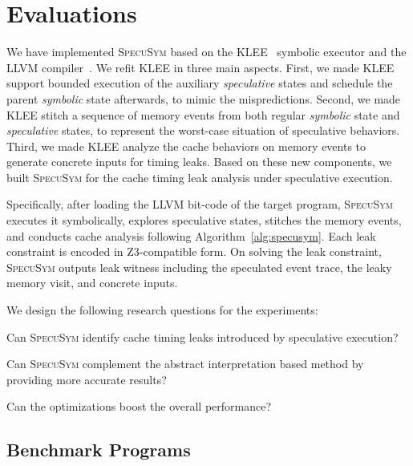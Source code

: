 \documentclass[sigconf]{acmart}
\newcommand{\SpecuSym}{\textsc{SpecuSym} }
\begin{document}
\section{Evaluations}
\label{sec:evaluation}


We have implemented \SpecuSym based on the KLEE~\cite{CadarDE08} symbolic 
executor and the LLVM compiler~\cite{LattnerA04}. We refit KLEE in three
main aspects. First, we made KLEE support bounded execution of the  
auxiliary \textit{speculative} states and schedule the parent \textit{symbolic} 
state afterwards, to mimic the mispredictions. Second, we made KLEE stitch 
a sequence of memory events from both regular \textit{symbolic} state and 
\textit{speculative} states, to represent the worst-case situation of 
speculative behaviors. Third, we made KLEE analyze the cache behaviors on 
memory events to generate concrete inputs for timing leaks. Based on these 
new components, we built \SpecuSym for the cache timing leak analysis 
under speculative execution.

Specifically, after loading the LLVM bit-code of the target program, \SpecuSym 
executes it symbolically, explores speculative states, stitches the memory 
events, and conducts cache analysis following Algorithm~\ref{alg:specusym}. 
Each leak constraint is encoded in Z3-compatible form. On solving the leak
constraint, \SpecuSym outputs leak witness including the speculated event 
trace, the leaky memory visit, and concrete inputs. 

We design the following research questions for the experiments: 
\begin{compactitem}
\item Can \SpecuSym identify cache timing leaks introduced 
by speculative execution?
\item Can \SpecuSym complement the abstract interpretation 
based method by providing more accurate results?
\item Can the optimizations boost the overall performance?
\end{compactitem}



\subsection{Benchmark Programs}
\label{sec:benchs}
\end{document}
